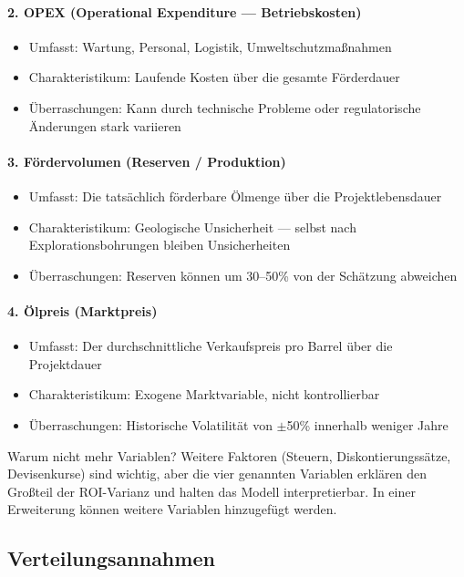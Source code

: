 \documentclass[12pt,a4paper]{article}
\begin{document}
\paragraph{2. OPEX (Operational Expenditure — Betriebskosten)}
\begin{itemize}[itemsep=1pt]
  \item Umfasst: Wartung, Personal, Logistik, Umweltschutzmaßnahmen
  \item Charakteristikum: Laufende Kosten über die gesamte Förderdauer
  \item Überraschungen: Kann durch technische Probleme oder regulatorische Änderungen stark variieren
\end{itemize}

\paragraph{3. Fördervolumen (Reserven / Produktion)}
\begin{itemize}[itemsep=1pt]
  \item Umfasst: Die tatsächlich förderbare Ölmenge über die Projektlebensdauer
  \item Charakteristikum: Geologische Unsicherheit — selbst nach Explorationsbohrungen bleiben Unsicherheiten
  \item Überraschungen: Reserven können um 30–50\% von der Schätzung abweichen
\end{itemize}

\paragraph{4. Ölpreis (Marktpreis)}
\begin{itemize}[itemsep=1pt]
  \item Umfasst: Der durchschnittliche Verkaufspreis pro Barrel über die Projektdauer
  \item Charakteristikum: Exogene Marktvariable, nicht kontrollierbar
  \item Überraschungen: Historische Volatilität von $\pm$50\% innerhalb weniger Jahre
\end{itemize}

Warum nicht mehr Variablen? Weitere Faktoren (Steuern, Diskontierungssätze, Devisenkurse) sind wichtig, aber die vier genannten Variablen erklären den Großteil der ROI-Varianz und halten das Modell interpretierbar. In einer Erweiterung können weitere Variablen hinzugefügt werden.

\subsection{Verteilungsannahmen}
\end{document}
